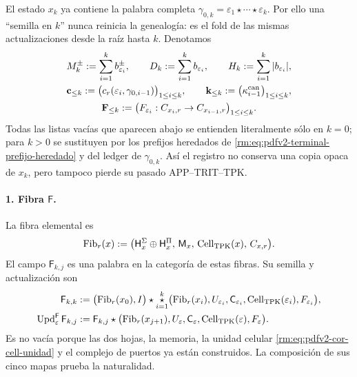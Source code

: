 El estado \(x_k\) ya contiene la palabra completa
\(\gamma_{0,k}=\varepsilon_1\star\cdots\star\varepsilon_k\). Por ello una
``semilla en \(k\)'' nunca reinicia la genealogía: es el fold de las mismas
actualizaciones desde la raíz hasta \(k\). Denotamos
\begin{equation}
\label{rm:eq:pdfv2-terminal-prefijo-heredado}
 \begin{gathered}
 M_k^\pm:=\sum_{i=1}^{k}b_{\varepsilon_i}^\pm,\qquad
 D_k:=\sum_{i=1}^{k}b_{\varepsilon_i},\qquad
 H_k:=\sum_{i=1}^{k}|b_{\varepsilon_i}|,\\
 \mathbf c_{\leq k}:=
  \bigl(c_r(\varepsilon_i,\gamma_{0,i-1})\bigr)_{1\leq i\leq k},
 \qquad
 \mathbf k_{\leq k}:=
  \bigl(\kappa_{i-1}^{\rm can}\bigr)_{1\leq i\leq k},\\
 \mathbf F_{\leq k}:=
  \bigl(F_{\varepsilon_i}:C_{x_i,r}\to C_{x_{i-1},r}\bigr)_{1\leq i\leq k}.
 \end{gathered}
\end{equation}
Todas las listas vacías que aparecen abajo se entienden literalmente sólo
en \(k=0\); para \(k>0\) se sustituyen por los prefijos heredados de
\eqref{rm:eq:pdfv2-terminal-prefijo-heredado} y del ledger de
\(\gamma_{0,k}\). Así el registro no conserva una copia opaca de \(x_k\),
pero tampoco pierde su pasado APP--TRIT--TPK.

\paragraph{1. Fibra \(\mathsf F\).}
La fibra elemental es
\begin{equation}
\label{rm:eq:pdfv2-terminal-tipo-fibra}
 \operatorname{Fib}_r(x):=
 \bigl(\mathsf H_x^\Sigma\oplus\mathsf H_x^\Pi,\,
       \mathsf M_x,\,
       \operatorname{Cell}_{\rm TPK}(x),\,C_{x,r}\bigr).
\end{equation}
El campo \(\mathsf F_{k,j}\) es una palabra en la categoría de estas fibras.
Su semilla y actualización son
\begin{align}
 \mathsf F_{k,k}
 &:=\bigl(\operatorname{Fib}_r(x_0),I\bigr)\star
 \mathop{\star}_{i=1}^{k}
 \bigl(\operatorname{Fib}_r(x_i),U_{\varepsilon_i},
 \mathsf C_{\varepsilon_i},\operatorname{Cell}_{\rm TPK}(\varepsilon_i),
 F_{\varepsilon_i}\bigr),
 \label{rm:eq:pdfv2-terminal-semilla-f}\\
 \operatorname{Upd}^{\mathsf F}_{\varepsilon}\mathsf F_{k,j}
 &:=
 \mathsf F_{k,j}\star
 \bigl(\operatorname{Fib}_r(x_{j+1}),U_\varepsilon,
 \mathsf C_\varepsilon,\operatorname{Cell}_{\rm TPK}(\varepsilon),
 F_\varepsilon\bigr).
 \label{rm:eq:pdfv2-terminal-update-f}
\end{align}
Es no vacía porque las dos hojas, la memoria, la unidad celular
\eqref{rm:eq:pdfv2-cor-cell-unidad} y el complejo de puertos ya están
construidos. La composición de sus cinco mapas prueba la naturalidad.

